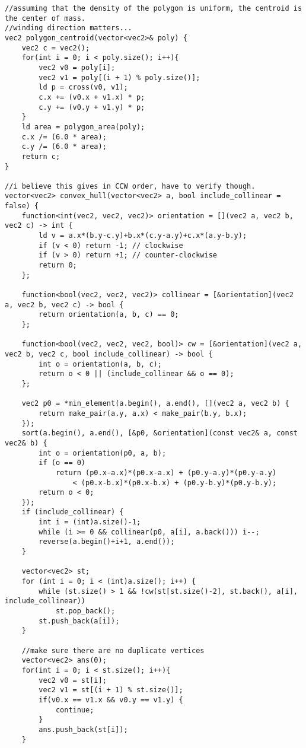 \documentclass[8pt, headheight=10pt, a4paper]{article}
\begin{document}
\begin{multicols*}{3}
\begin{lstlisting}
//assuming that the density of the polygon is uniform, the centroid is the center of mass.
//winding direction matters...
vec2 polygon_centroid(vector<vec2>& poly) {
    vec2 c = vec2();
    for(int i = 0; i < poly.size(); i++){
        vec2 v0 = poly[i];
        vec2 v1 = poly[(i + 1) % poly.size()];
        ld p = cross(v0, v1);
        c.x += (v0.x + v1.x) * p;
        c.y += (v0.y + v1.y) * p;
    }
    ld area = polygon_area(poly);
    c.x /= (6.0 * area);
    c.y /= (6.0 * area);
    return c;
}

//i believe this gives in CCW order, have to verify though. 
vector<vec2> convex_hull(vector<vec2> a, bool include_collinear = false) {
    function<int(vec2, vec2, vec2)> orientation = [](vec2 a, vec2 b, vec2 c) -> int {
        ld v = a.x*(b.y-c.y)+b.x*(c.y-a.y)+c.x*(a.y-b.y);
        if (v < 0) return -1; // clockwise
        if (v > 0) return +1; // counter-clockwise
        return 0;
    };

    function<bool(vec2, vec2, vec2)> collinear = [&orientation](vec2 a, vec2 b, vec2 c) -> bool {
        return orientation(a, b, c) == 0;
    };

    function<bool(vec2, vec2, vec2, bool)> cw = [&orientation](vec2 a, vec2 b, vec2 c, bool include_collinear) -> bool {
        int o = orientation(a, b, c);
        return o < 0 || (include_collinear && o == 0);
    };

    vec2 p0 = *min_element(a.begin(), a.end(), [](vec2 a, vec2 b) {
        return make_pair(a.y, a.x) < make_pair(b.y, b.x);
    });
    sort(a.begin(), a.end(), [&p0, &orientation](const vec2& a, const vec2& b) {
        int o = orientation(p0, a, b);
        if (o == 0)
            return (p0.x-a.x)*(p0.x-a.x) + (p0.y-a.y)*(p0.y-a.y)
                < (p0.x-b.x)*(p0.x-b.x) + (p0.y-b.y)*(p0.y-b.y);
        return o < 0;
    });
    if (include_collinear) {
        int i = (int)a.size()-1;
        while (i >= 0 && collinear(p0, a[i], a.back())) i--;
        reverse(a.begin()+i+1, a.end());
    }

    vector<vec2> st;
    for (int i = 0; i < (int)a.size(); i++) {
        while (st.size() > 1 && !cw(st[st.size()-2], st.back(), a[i], include_collinear))
            st.pop_back();
        st.push_back(a[i]);
    }

    //make sure there are no duplicate vertices
    vector<vec2> ans(0);
    for(int i = 0; i < st.size(); i++){
        vec2 v0 = st[i];
        vec2 v1 = st[(i + 1) % st.size()];
        if(v0.x == v1.x && v0.y == v1.y) {
            continue;
        }
        ans.push_back(st[i]);
    }


\end{lstlisting}
\end{multicols*}
\end{document}
